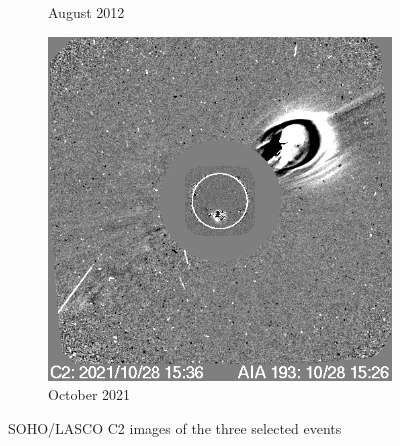 \begin{figure}[h!]
\begin{subfigure}[b]{0.3\textwidth}
        \caption[August  2012 CME]{August  2012}
        \label{fig:soho_cme_aug_31_2012}
    \end{subfigure}
    \hfill
    \begin{subfigure}[b]{0.3\textwidth}
        \includegraphics[width=\textwidth]{images/soho_cme_oct_28_2021.png}
        \caption[October  2021]{October  2021}
        \label{fig:soho_cme_oct_28_2021}
    \end{subfigure}
    \caption[SOHO/LASCO C2 images of the selected events]{SOHO/LASCO C2 images of the three selected events}
    \label{fig:cme_events_soho_pics}
\end{figure}

